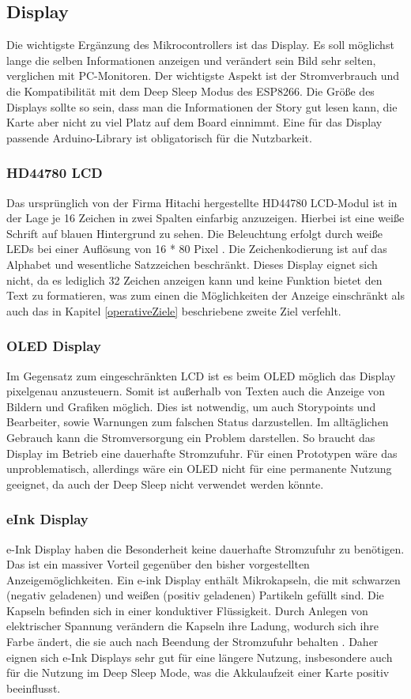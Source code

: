 \documentclass[12pt,titlepage]{scrartcl}
\begin{document}
		\subsection{Display}
		Die wichtigste Ergänzung des Mikrocontrollers ist das Display. Es soll möglichst lange die selben Informationen anzeigen und verändert sein Bild sehr selten, verglichen mit PC-Monitoren. Der wichtigste Aspekt ist der Stromverbrauch und die Kompatibilität mit dem Deep Sleep Modus des ESP8266.  Die Größe des Displays sollte so sein, dass man die Informationen der Story gut lesen kann, die Karte aber nicht zu viel Platz auf dem Board einnimmt. Eine für das Display passende Arduino-Library ist obligatorisch für die Nutzbarkeit.
			\subsubsection{HD44780 LCD}
			Das ursprünglich von der Firma Hitachi hergestellte HD44780 LCD-Modul ist in der Lage je 16 Zeichen in zwei Spalten einfarbig anzuzeigen. Hierbei ist eine weiße Schrift auf blauen Hintergrund zu sehen. Die Beleuchtung erfolgt durch weiße LEDs bei einer Auflösung von 16 * 80 Pixel \cite{hd44780manual}. Die Zeichenkodierung ist auf das Alphabet und wesentliche Satzzeichen beschränkt. Dieses Display eignet sich nicht, da es lediglich 32 Zeichen anzeigen kann und keine Funktion bietet den Text zu formatieren, was zum einen die Möglichkeiten der Anzeige einschränkt als auch das in Kapitel \ref{operativeZiele} beschriebene zweite Ziel verfehlt.
			\subsubsection{OLED Display}
			Im Gegensatz zum eingeschränkten LCD ist es beim OLED möglich das Display pixelgenau anzusteuern. Somit ist außerhalb von Texten auch die Anzeige von Bildern und Grafiken möglich. Dies ist notwendig, um auch Storypoints und Bearbeiter, sowie Warnungen zum falschen Status darzustellen. Im alltäglichen Gebrauch kann die Stromversorgung ein Problem darstellen. So braucht das Display im Betrieb eine dauerhafte Stromzufuhr. Für einen Prototypen wäre das unproblematisch, allerdings wäre ein OLED nicht für eine permanente Nutzung geeignet, da auch der Deep Sleep nicht verwendet werden könnte.
			\subsubsection{eInk Display}
			e-Ink Display haben die Besonderheit keine dauerhafte Stromzufuhr zu benötigen. Das ist ein massiver Vorteil gegenüber den bisher vorgestellten Anzeigemöglichkeiten. Ein e-ink Display enthält Mikrokapseln, die mit schwarzen (negativ geladenen) und weißen (positiv geladenen) Partikeln gefüllt sind. Die Kapseln befinden sich in einer konduktiver Flüssigkeit. Durch Anlegen von elektrischer Spannung verändern die Kapseln ihre Ladung, wodurch sich ihre Farbe ändert, die sie auch nach Beendung der Stromzufuhr behalten \cite{einktech}.
Daher eignen sich e-Ink Displays sehr gut für eine längere Nutzung, insbesondere auch für die Nutzung im Deep Sleep Mode, was die Akkulaufzeit einer Karte positiv beeinflusst. 
\end{document}
